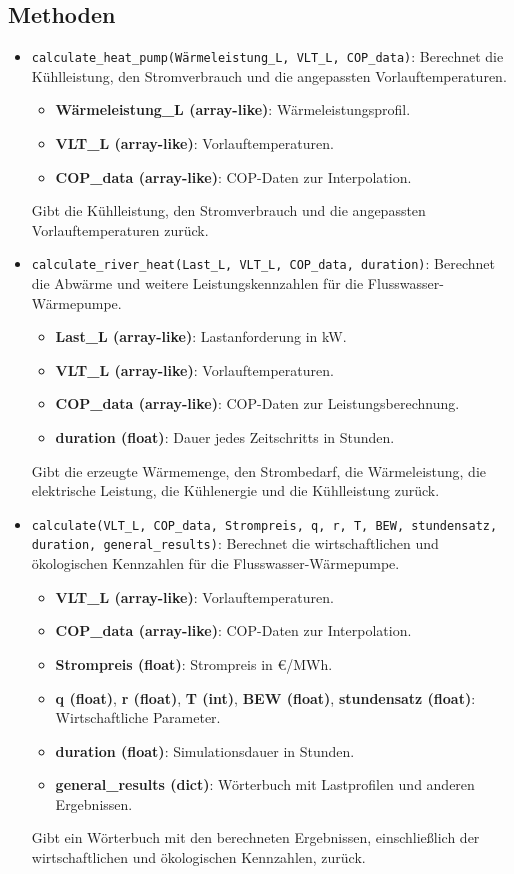 \subsection{Methoden}
\begin{itemize}
    \item \texttt{calculate\_heat\_pump(Wärmeleistung\_L, VLT\_L, COP\_data)}: Berechnet die Kühlleistung, den Stromverbrauch und die angepassten Vorlauftemperaturen.
    \begin{itemize}
        \item \textbf{Wärmeleistung\_L (array-like)}: Wärmeleistungsprofil.
        \item \textbf{VLT\_L (array-like)}: Vorlauftemperaturen.
        \item \textbf{COP\_data (array-like)}: COP-Daten zur Interpolation.
    \end{itemize}
    Gibt die Kühlleistung, den Stromverbrauch und die angepassten Vorlauftemperaturen zurück.

    \item \texttt{calculate\_river\_heat(Last\_L, VLT\_L, COP\_data, duration)}: Berechnet die Abwärme und weitere Leistungskennzahlen für die Flusswasser-Wärmepumpe.
    \begin{itemize}
        \item \textbf{Last\_L (array-like)}: Lastanforderung in kW.
        \item \textbf{VLT\_L (array-like)}: Vorlauftemperaturen.
        \item \textbf{COP\_data (array-like)}: COP-Daten zur Leistungsberechnung.
        \item \textbf{duration (float)}: Dauer jedes Zeitschritts in Stunden.
    \end{itemize}
    Gibt die erzeugte Wärmemenge, den Strombedarf, die Wärmeleistung, die elektrische Leistung, die Kühlenergie und die Kühlleistung zurück.

    \item \texttt{calculate(VLT\_L, COP\_data, Strompreis, q, r, T, BEW, stundensatz, duration, general\_results)}: Berechnet die wirtschaftlichen und ökologischen Kennzahlen für die Flusswasser-Wärmepumpe.
    \begin{itemize}
        \item \textbf{VLT\_L (array-like)}: Vorlauftemperaturen.
        \item \textbf{COP\_data (array-like)}: COP-Daten zur Interpolation.
        \item \textbf{Strompreis (float)}: Strompreis in €/MWh.
        \item \textbf{q (float)}, \textbf{r (float)}, \textbf{T (int)}, \textbf{BEW (float)}, \textbf{stundensatz (float)}: Wirtschaftliche Parameter.
        \item \textbf{duration (float)}: Simulationsdauer in Stunden.
        \item \textbf{general\_results (dict)}: Wörterbuch mit Lastprofilen und anderen Ergebnissen.
    \end{itemize}
    Gibt ein Wörterbuch mit den berechneten Ergebnissen, einschließlich der wirtschaftlichen und ökologischen Kennzahlen, zurück.


\end{itemize}
